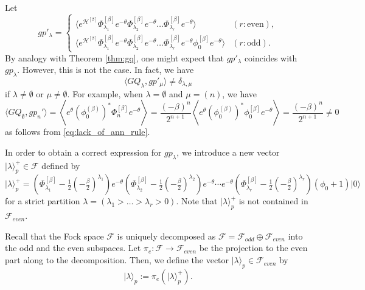 \documentclass{amsart}
\def\ket#1{\vert #1 \rangle}
\begin{document}
Let 
\begin{equation}\label{eq:gp_prime}
gp'_\lambda=
\begin{cases}
\langle
e^{\mathcal{H}^{[\beta]}}
\Phi^{[\beta]}_{\lambda_1}e^{-\theta}
\Phi^{[\beta]}_{\lambda_2}e^{-\theta}
\dots
\Phi^{[\beta]}_{\lambda_r}e^{-\theta}
\rangle & (r:\mbox{even}),\\
\langle
e^{\mathcal{H}^{[\beta]}}
\Phi^{[\beta]}_{\lambda_1}e^{-\theta}
\Phi^{[\beta]}_{\lambda_2}e^{-\theta}
\dots
\Phi^{[\beta]}_{\lambda_r}e^{-\theta}
\phi^{[\beta]}_{0}e^{-\theta}
\rangle & (r:\mbox{odd}).
\end{cases}
\end{equation}
By analogy with Theorem \ref{thm:gq}, one might expect that $gp'_\lambda$ coincides with $gp_\lambda$.
However, this is not the case.
In fact, we have
\begin{equation}\label{eq:Fal}
\langle
GQ_{\lambda},gp'_\mu
\rangle\neq \delta_{\lambda,\mu}
\end{equation}
if $\lambda\neq \emptyset$ or $\mu\neq \emptyset$.
For example, when $\lambda=\emptyset$ and $\mu=(n)$, we have
\[
\langle
GQ_\emptyset,gp_n'
\rangle
=
\left\langle
e^\theta (\phi_0^{(\beta)})^\ast
\Phi^{[\beta]}_ne^{-\theta}
\right\rangle
=
\frac{(-\beta)^n}{2^{n+1}}
\left\langle
e^\theta (\phi_0^{(\beta)})^\ast
\phi^{[\beta]}_0e^{-\theta}
\right\rangle
=
\frac{(-\beta)^n}{2^{n+1}}
\neq 0
\]
as follows from \eqref{eq:lack_of_ann_rule}.

In order to obtain a correct expression for $gp_\lambda$, we introduce a new vector $\ket{\lambda}^+_p\in \mathcal{F}$ defined by
\begin{equation}\label{eq:ket_p}
\ket{\lambda}^+_p
=
\left(\Phi^{[\beta]}_{\lambda_1}-\tfrac{1}{2}(-\tfrac{\beta}{2})^{\lambda_1}\right)e^{-\theta}
\left(\Phi^{[\beta]}_{\lambda_2}-\tfrac{1}{2}(-\tfrac{\beta}{2})^{\lambda_2}\right)e^{-\theta}
\cdots
e^{-\theta}
\left(\Phi^{[\beta]}_{\lambda_r}-\tfrac{1}{2}(-\tfrac{\beta}{2})^{\lambda_r}\right)(\phi_0+1)\ket{0}
\end{equation}
for a strict partition $\lambda=(\lambda_1>\dots>\lambda_r>0)$.
Note that $\ket{\lambda}^+_p$ is not contained in $\mathcal{F}_{even}$.

Recall that the Fock space $\mathcal{F}$ is uniquely decomposed as  $\mathcal{F}=\mathcal{F}_{odd}\oplus \mathcal{F}_{even}$ into the odd and the even subspaces.
Let $\pi_{e}:\mathcal{F}\to \mathcal{F}_{even}$ be the projection to the even part along to the decomposition.
Then, we define the vector $\ket{\lambda}_p\in \mathcal{F}_{even}$ by 
\[
\ket{\lambda}_p:=\pi_e\left(\ket{\lambda}^+_p\right).
\]
\end{document}
